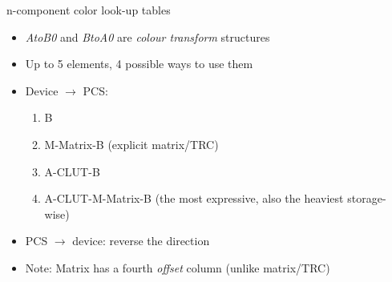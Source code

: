 \documentclass[aspectratio=169]{fireshonks}
\begin{document}
\begin{frame}{n-component color look-up tables}
  \begin{itemize}
    \item \emph{AtoB0} and \emph{BtoA0} are \emph{colour transform} structures
    \item Up to 5 elements, 4 possible ways to use them
    \item Device $\rightarrow$ PCS:
          \begin{enumerate}
            \item B
            \item M-Matrix-B (explicit matrix/TRC)
            \item A-CLUT-B
            \item A-CLUT-M-Matrix-B (the most expressive, also the heaviest storage-wise)
          \end{enumerate}
    \item PCS $\rightarrow$ device: reverse the direction
    \item Note: Matrix has a fourth \emph{offset} column (unlike matrix/TRC)
  \end{itemize}
\end{frame}
\end{document}
